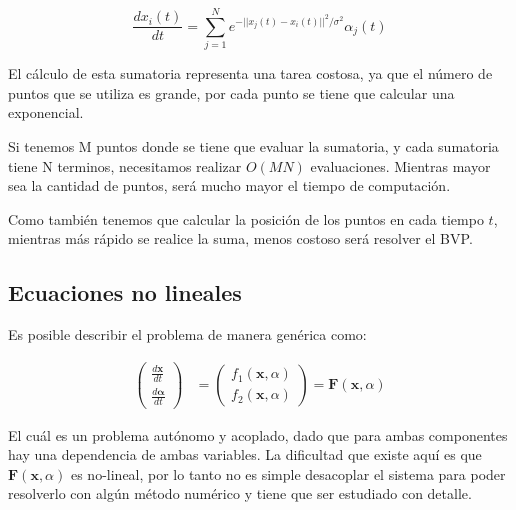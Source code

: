 \documentclass[letter, 10pt]{article}
\begin{document}
\begin{equation*}
\frac{d x_i(t)}{dt} = \displaystyle\sum_{j=1}^N e^{-|| x_j(t) - x_i(t)||^2 / \sigma^2} \alpha_j(t)
\end{equation*}
 
El cálculo de esta sumatoria representa una tarea costosa, ya que el número de puntos que se utiliza es grande, por cada punto se tiene que calcular una exponencial.

Si tenemos M puntos donde se tiene que evaluar la sumatoria, y cada sumatoria tiene N terminos, necesitamos realizar $O(MN)$ evaluaciones. Mientras mayor sea la cantidad de puntos, será mucho mayor el tiempo de computación.

Como también tenemos que calcular la posición de los puntos en cada tiempo $t$, mientras más rápido se realice la suma, menos costoso será resolver el BVP.


\subsection{Ecuaciones no lineales}

Es posible describir el problema de manera genérica como:

\begin{align}
\begin{pmatrix}
 \frac{d\mathbf{x}}{dt} \\
 \frac{d\mathbf{\alpha}}{dt}
\end{pmatrix}
& = 
\begin{pmatrix}
f_1(\mathbf{x}, \alpha) \\
f_2(\mathbf{x}, \alpha)
\end{pmatrix}
= \mathbf{F}(\mathbf{x}, \alpha) \label{edof}
\end{align}

 El cuál es un problema autónomo y acoplado, dado que para ambas componentes hay una dependencia de ambas variables. La dificultad que existe aquí es que $\mathbf{F}(\mathbf{x}, \alpha)$ es no-lineal, por lo tanto no es simple desacoplar el sistema para poder resolverlo con algún método numérico y  tiene que ser estudiado con detalle. 
 
\end{document}
